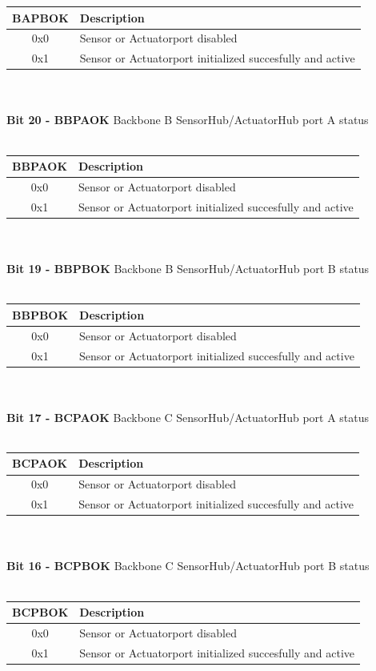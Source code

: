 \documentclass{article}
\begin{document}
\begin{tabular}{|c|l|}
    \hline
   BAPBOK & Description\\ \hline
   0x0 & Sensor or Actuatorport disabled\\ \hline
   0x1 & Sensor or Actuatorport initialized succesfully and active\\ \hline
\end{tabular}\\\\
\textbf{Bit 20 - BBPAOK} Backbone B SensorHub/ActuatorHub port A status\\\\
\begin{tabular}{|c|l|}
    \hline
   BBPAOK & Description\\ \hline
   0x0 & Sensor or Actuatorport disabled\\ \hline
   0x1 & Sensor or Actuatorport initialized succesfully and active\\ \hline
\end{tabular}\\\\
\textbf{Bit 19 - BBPBOK} Backbone B SensorHub/ActuatorHub port B status\\\\
\begin{tabular}{|c|l|}
    \hline
   BBPBOK & Description\\ \hline
   0x0 & Sensor or Actuatorport disabled\\ \hline
   0x1 & Sensor or Actuatorport initialized succesfully and active\\ \hline
\end{tabular}\\\\
\textbf{Bit 17 - BCPAOK} Backbone C SensorHub/ActuatorHub port A status\\\\
\begin{tabular}{|c|l|}
    \hline
   BCPAOK & Description\\ \hline
   0x0 & Sensor or Actuatorport disabled\\ \hline
   0x1 & Sensor or Actuatorport initialized succesfully and active\\ \hline
\end{tabular}\\\\
\textbf{Bit 16 - BCPBOK} Backbone C SensorHub/ActuatorHub port B status\\\\
\begin{tabular}{|c|l|}
    \hline
   BCPBOK & Description\\ \hline
   0x0 & Sensor or Actuatorport disabled\\ \hline
   0x1 & Sensor or Actuatorport initialized succesfully and active\\ \hline
\end{tabular}\\\\
\end{document}
